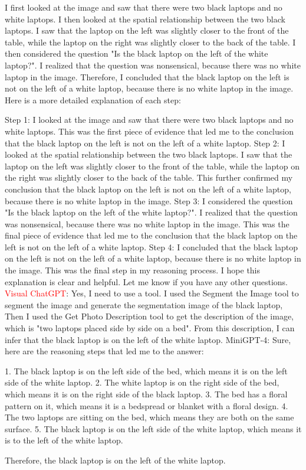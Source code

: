 \begin{enumerate}
        I first looked at the image and saw that there were two black laptops and no white laptops.
        I then looked at the spatial relationship between the two black laptops. I saw that the laptop on the left was slightly closer to the front of the table, while the laptop on the right was slightly closer to the back of the table.
        I then considered the question "Is the black laptop on the left of the white laptop?". I realized that the question was nonsensical, because there was no white laptop in the image.
        Therefore, I concluded that the black laptop on the left is not on the left of a white laptop, because there is no white laptop in the image.
        Here is a more detailed explanation of each step:

        Step 1: I looked at the image and saw that there were two black laptops and no white laptops. This was the first piece of evidence that led me to the conclusion that the black laptop on the left is not on the left of a white laptop.
        Step 2: I looked at the spatial relationship between the two black laptops. I saw that the laptop on the left was slightly closer to the front of the table, while the laptop on the right was slightly closer to the back of the table. This further confirmed my conclusion that the black laptop on the left is not on the left of a white laptop, because there is no white laptop in the image.
        Step 3: I considered the question "Is the black laptop on the left of the white laptop?". I realized that the question was nonsensical, because there was no white laptop in the image. This was the final piece of evidence that led me to the conclusion that the black laptop on the left is not on the left of a white laptop.
        Step 4: I concluded that the black laptop on the left is not on the left of a white laptop, because there is no white laptop in the image. This was the final step in my reasoning process.
        I hope this explanation is clear and helpful. Let me know if you have any other questions.
        \subitem \textcolor{red}{Visual ChatGPT}: Yes, I need to use a tool. I used the Segment the Image tool to segment the image and generate the segmentation image of the black laptop, Then I used the Get Photo Description tool to get the description of the image, which is "two laptops placed side by side on a bed". From this description, I can infer that the black laptop is on the left of the white laptop.
        \subitem MiniGPT-4: Sure, here are the reasoning steps that led me to the answer:

        1. The black laptop is on the left side of the bed, which means it is on the left side of the white laptop.
        2. The white laptop is on the right side of the bed, which means it is on the right side of the black laptop.
        3. The bed has a floral pattern on it, which means it is a bedspread or blanket with a floral design.
        4. The two laptops are sitting on the bed, which means they are both on the same surface.
        5. The black laptop is on the left side of the white laptop, which means it is to the left of the white laptop.
        
        Therefore, the black laptop is on the left of the white laptop.
    \end{enumerate}
